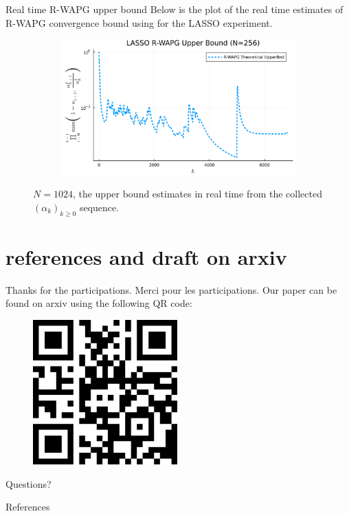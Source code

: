 \documentclass[11pt]{beamer}
\theoremstyle{definition}
\begin{document}
        \begin{frame}{Real time R-WAPG upper bound}
            Below is the plot of the real time estimates of R-WAPG convergence bound using for the LASSO experiment. 
            \begin{figure}[H]
                \centering
                \begin{subfigure}[b]{0.75\textwidth}
                    \centering
                    \includegraphics[width=\textwidth]{
                        assets/lasso_rwapg_upperbnd_256.png
                    }
                \end{subfigure}
                \caption{
                    $N = 1024$, the upper bound estimates in real time from the collected $(\alpha_k)_{k \ge 0}$ sequence. 
                }
                \label{fig:single-lass-r-wapg-rwapg-upperbnd}
            \end{figure}
        \end{frame}

\section{references and draft on arxiv}
    \begin{frame}{Thanks for the participations. Merci pour les participations.}
        Our paper can be found on arxiv using the following QR code: 
        \begin{figure}
            \centering
            \includegraphics[width=15em]{assets/paper-qrcode.png}
        \end{figure}
        Questions?
    \end{frame}
    \begin{frame}{References}        
        
    \end{frame}
\end{document}
